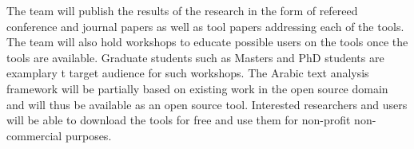 \documentclass[12pt]{article}
\begin{document}
The team will publish the results of the research in the form 
of refereed conference and journal papers as well as tool papers 
addressing each of the tools. 
The team will also hold workshops to educate possible users on the 
tools once the tools are available.
Graduate students such as Masters and PhD students are examplary t
target audience for such workshops.
The Arabic text analysis framework will be partially based on 
existing work in the open source domain and will thus be available 
as an open source tool. 
Interested researchers and users will be able to download the 
tools for free and use them for non-profit non-commercial 
purposes.  

\pagebreak
%
%

%
{\small
  
}
\end{document}
